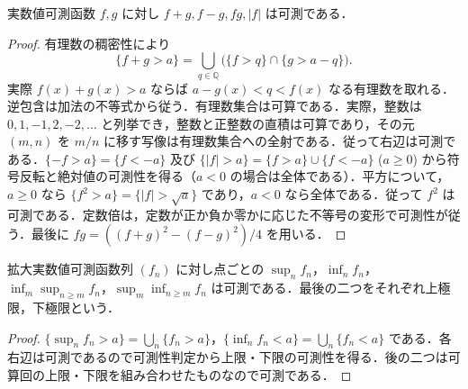 \begin{prop}[実数値可測函数の演算]
実数値可測函数 $f,g$ に対し $f+g,f-g,fg,|f|$ は可測である．
\end{prop}
\begin{proof}
有理数の稠密性により
\[
 \{f+g>a\}=\bigcup_{q\in\mathbb Q}
 \bigl(\{f>q\}\cap\{g>a-q\}\bigr).
\]
実際 $f(x)+g(x)>a$ ならば $a-g(x)<q<f(x)$ なる有理数を取れる．逆包含は加法の不等式から従う．有理数集合は可算である．実際，整数は $0,1,-1,2,-2,\ldots$ と列挙でき，整数と正整数の直積は可算であり，その元 $(m,n)$ を $m/n$ に移す写像は有理数集合への全射である．従って右辺は可測である．$\{-f>a\}=\{f<-a\}$ 及び $\{|f|>a\}=\{f>a\}\cup\{f<-a\}$ ($a\geq0$) から符号反転と絶対値の可測性を得る（$a<0$ の場合は全体である）．平方について，$a\geq0$ なら $\{f^2>a\}=\{|f|>\sqrt a\}$ であり，$a<0$ なら全体である．従って $f^2$ は可測である．定数倍は，定数が正か負か零かに応じた不等号の変形で可測性が従う．最後に $fg=((f+g)^2-(f-g)^2)/4$ を用いる．
\end{proof}
\begin{prop}[可測函数列の上限と下限]
拡大実数値可測函数列 $(f_n)$ に対し点ごとの $\sup_n f_n$，$\inf_n f_n$，$\inf_m\sup_{n\geq m}f_n$，$\sup_m\inf_{n\geq m}f_n$ は可測である．最後の二つをそれぞれ上極限，下極限という．
\end{prop}
\begin{proof}
$\{\sup_n f_n>a\}=\bigcup_n\{f_n>a\}$，$\{\inf_n f_n<a\}=\bigcup_n\{f_n<a\}$ である．各右辺は可測であるので可測性判定から上限・下限の可測性を得る．後の二つは可算回の上限・下限を組み合わせたものなので可測である．
\end{proof}
